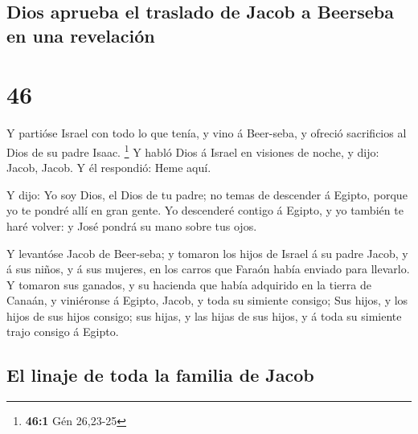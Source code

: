 \hypertarget{dios-aprueba-el-traslado-de-jacob-a-beerseba-en-una-revelaciuxf3n}{%
\subsection{Dios aprueba el traslado de Jacob a Beerseba en una
revelación}\label{dios-aprueba-el-traslado-de-jacob-a-beerseba-en-una-revelaciuxf3n}}

\hypertarget{section-45}{%
\section{46}\label{section-45}}

 Y partióse Israel con todo lo que tenía, y vino á
Beer-seba, y ofreció sacrificios al Dios de su padre Isaac. \footnote{\textbf{46:1}
  Gén 26,23-25}  Y habló Dios á Israel en visiones de noche,
y dijo: Jacob, Jacob. Y él respondió: Heme aquí.

 Y dijo: Yo soy Dios, el Dios de tu padre; no temas de
descender á Egipto, porque yo te pondré allí en gran gente. 
Yo descenderé contigo á Egipto, y yo también te haré volver: y José
pondrá su mano sobre tus ojos.

 Y levantóse Jacob de Beer-seba; y tomaron los hijos de
Israel á su padre Jacob, y á sus niños, y á sus mujeres, en los carros
que Faraón había enviado para llevarlo.  Y tomaron sus
ganados, y su hacienda que había adquirido en la tierra de Canaán, y
viniéronse á Egipto, Jacob, y toda su simiente consigo;  Sus
hijos, y los hijos de sus hijos consigo; sus hijas, y las hijas de sus
hijos, y á toda su simiente trajo consigo á Egipto.

\hypertarget{el-linaje-de-toda-la-familia-de-jacob}{%
\subsection{El linaje de toda la familia de
Jacob}\label{el-linaje-de-toda-la-familia-de-jacob}}

